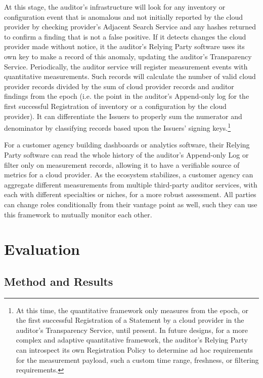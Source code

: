 \documentclass{jdf}
\begin{document}
At this stage, the auditor's infrastructure will look for any inventory or configuration event that is anomalous and not initially reported by the cloud provider by checking provider's Adjacent Search Service and any hashes returned to confirm a finding that is not a false positive. If it detects changes the cloud provider made without notice, it the auditor's Relying Party software uses its own key to make a record of this anomaly, updating the auditor's Transparency Service. Periodically, the auditor service will register measurement events with quantitative measurements. Such records will calculate the number of valid cloud provider records divided by the sum of cloud provider records and auditor findings from the epoch (i.e. the point in the auditor's Append-only log for the first successful Registration of inventory or a configuration by the cloud provider). It can differentiate the Issuers to properly sum the numerator and denominator by classifying records based upon the Issuers' signing keys.\footnote{At this time, the quantitative framework only measures from the epoch, or the first successful Registration of a Statement by a cloud provider in the auditor's Transparency Service, until present. In future designs, for a more complex and adaptive quantitative framework, the auditor's Relying Party can introspect its own Registration Policy to determine ad hoc requirements for the measurement payload, such a custom time range, freshness, or filtering requirements.}

For a customer agency building dashboards or analytics software, their Relying Party software can read the whole history of the auditor's Append-only Log or filter only on measurement records, allowing it to have a verifiable source of metrics for a cloud provider. As the ecosystem stabilizes, a customer agency can aggregate different measurements from multiple third-party auditor services, with each with different specialties or niches, for a more robust assessment. All parties can change roles conditionally from their vantage point as well, such they can use this framework to mutually monitor each other.

\section{Evaluation}

\subsection{Method and Results}
\end{document}
